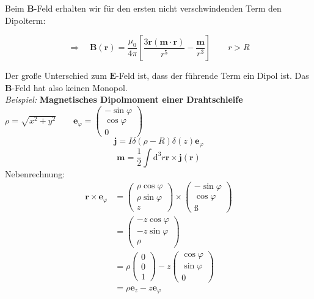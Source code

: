 \documentclass[titlepage,11pt,a4paper,ngerman]{report}
\newcommand{\tx}[1]{\textrm{#1}}
\newcommand{\dd}{\tx{d}}
\renewcommand{\vec}[1]{\boldsymbol{#1}}
\newcommand{\frbox}[2]{\begin{tcolorbox}[colback=white,colframe=red!75!black,fonttitle=\bfseries,title=#1]#2\end{tcolorbox}}
\begin{document}
Beim $ \vec{B} $-Feld erhalten wir für den ersten nicht verschwindenden Term den Dipolterm:
\frbox{Multipolentwicklung des Magnetfeldes (1. Term)}{
\begin{equation*}
\Rightarrow \quad \vec{B}(\vec{r}) = \frac{\mu_0}{4 \pi} \left[\frac{3 \vec{r}(\vec{m} \cdot \vec{r})}{r^5} - \frac{\vec{m}}{r^3}\right] \qquad r > R
\end{equation*}
}
Der große Unterschied zum $ \vec{E} $-Feld ist, dass der führende Term ein Dipol ist. Das $ \vec{B} $-Feld hat also keinen Monopol.\\[5pt]
\emph{Beispiel:} \textbf{Magnetisches Dipolmoment einer Drahtschleife}
%
%
$ \rho = \sqrt{x^2 + y^2} \qquad \vec{e}_{\varphi} = \begin{pmatrix}
- \sin \varphi \\ \cos \varphi \\ 0
\end{pmatrix}$
\begin{equation*}
\vec{j} = I \delta(\rho - R) \delta(z) \vec{e}_{\varphi}
\end{equation*}
\begin{equation*}
\vec{m} = \frac{1}{2} \int \dd^3 r \vec{r} \times \vec{j}(\vec{r})
\end{equation*}
Nebenrechnung:
\begin{align*}
\vec{r} \times \vec{e}_{\varphi} &= \begin{pmatrix}
\rho \cos \varphi \\ \rho \sin \varphi \\ z
\end{pmatrix} \times \begin{pmatrix}
- \sin \varphi \\ \cos \varphi \\ ß
\end{pmatrix}\\
&= \begin{pmatrix}
- z \cos \varphi \\ - z \sin \varphi \\ \rho
\end{pmatrix}\\
&= \rho \begin{pmatrix}
0 \\ 0 \\ 1
\end{pmatrix} - z \begin{pmatrix}
\cos \varphi \\ \sin \varphi \\ 0
\end{pmatrix}\\
&= \rho \vec{e}_z - z \vec{e}_{\varphi}
\end{align*}
\end{document}
